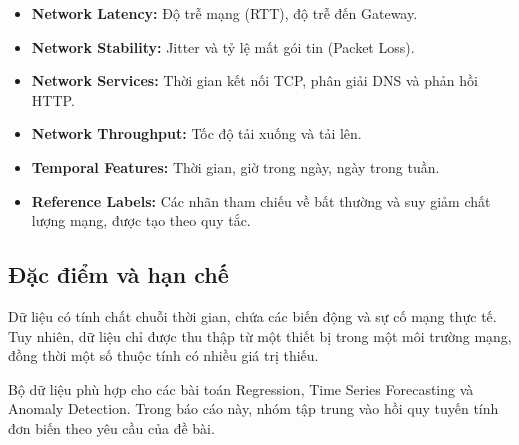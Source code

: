 \begin{itemize}
    \item \textbf{Network Latency:}
    Độ trễ mạng (RTT), độ trễ đến Gateway.

    \item \textbf{Network Stability:}
    Jitter và tỷ lệ mất gói tin (Packet Loss).

    \item \textbf{Network Services:}
    Thời gian kết nối TCP, phân giải DNS và phản hồi HTTP.

    \item \textbf{Network Throughput:}
    Tốc độ tải xuống và tải lên.

    \item \textbf{Temporal Features:}
    Thời gian, giờ trong ngày, ngày trong tuần.

    \item \textbf{Reference Labels:}
    Các nhãn tham chiếu về bất thường và suy giảm
    chất lượng mạng, được tạo theo quy tắc.
\end{itemize}

\subsection{Đặc điểm và hạn chế}

Dữ liệu có tính chất chuỗi thời gian, chứa các biến động và sự cố mạng thực tế. Tuy nhiên, dữ liệu chỉ được thu thập từ một thiết bị trong một môi trường mạng, đồng thời một số thuộc tính có nhiều giá trị thiếu.

Bộ dữ liệu phù hợp cho các bài toán Regression, Time Series Forecasting và Anomaly Detection. Trong báo cáo này, nhóm tập trung vào hồi quy tuyến tính đơn biến theo yêu cầu của đề bài.